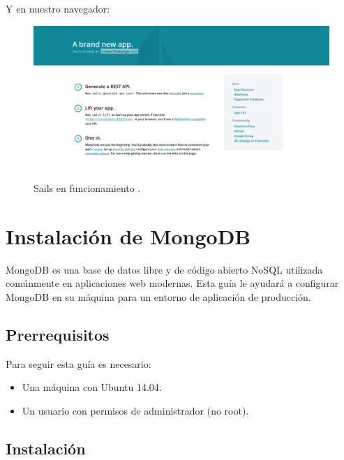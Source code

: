 \begin{appendices}
Y en nuestro navegador:\\

\begin{figure}[H]
  \begin{center}
    \includegraphics[scale=0.3]{imagenes/browser_sails.png}
  \end{center}
  \label{fig:logo}
 \caption{Sails en funcionamiento \protect\footnotemark.}
\end{figure}



\section{Instalación de MongoDB}

MongoDB es una base de datos libre y de código abierto NoSQL utilizada comúnmente en aplicaciones web modernas. Esta guía le ayudará a configurar MongoDB en su máquina para un entorno de aplicación de producción.\\

\subsection{Prerrequisitos}

Para seguir esta guía es necesario:
\begin{itemize}

\item{Una máquina con Ubuntu 14.04.}
\item{Un usuario con permisos de administrador (no root).}
\end{itemize}

\subsection{Instalación}



\end{appendices}
